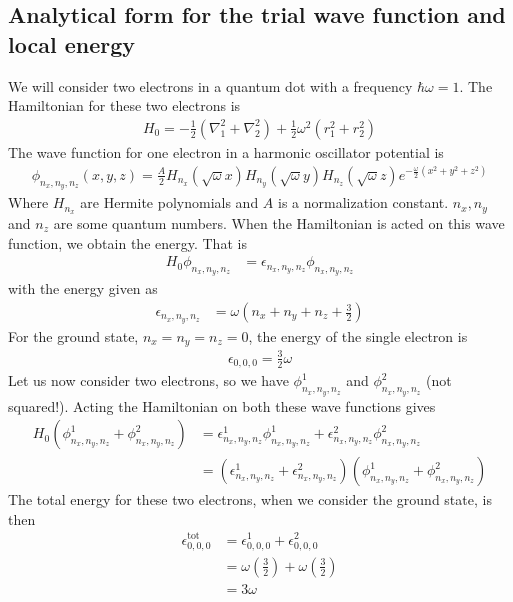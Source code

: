 \documentclass[12pt]{article}
\begin{document}
\subsection{Analytical form for the trial wave function and local energy}
We will consider two electrons in a quantum dot with a frequency $\hbar \omega = 1$. The Hamiltonian for these two electrons is
\begin{align*}
H_0 = -\frac{1}{2}(\nabla_1^2 + \nabla_2^2) + \frac{1}{2}\omega^2(r_1^2 + r_2^2)
\end{align*}
The wave function for one electron in a harmonic oscillator potential is
\begin{align*}
\phi_{n_x, n_y, n_z}(x,y,z) = \frac{A}{2}H_{n_x}(\sqrt{\omega} x)H_{n_y}(\sqrt{\omega}y)H_{n_z}(\sqrt{\omega}z)e^{-\frac{\omega}{2}(x^2+y^2+z^2)}
\end{align*}
Where $H_{n_x}$ are Hermite polynomials and $A$ is a normalization constant. $n_x, n_y$ and $n_z$ are some quantum numbers. When the Hamiltonian is acted on this wave function, we obtain the energy. That is
\begin{align*}
H_0\phi_{n_x, n_y, n_z} &= \epsilon_{n_x, n_y, n_z}\phi_{n_x, n_y, n_z}
\end{align*}
with the energy given as
\begin{align*}
\epsilon_{n_x, n_y, n_z} &= \omega\left(n_x + n_y + n_z + \frac{3}{2} \right)
\end{align*}
For the ground state, $n_x = n_y = n_z = 0$, the energy of the single electron is
\begin{align*}
\epsilon_{0,0,0} = \frac{3}{2}\omega
\end{align*}
Let us now consider two electrons, so we have $\phi_{n_x, n_y, n_z}^1$ and $\phi_{n_x, n_y, n_z}^2$ (not squared!). Acting the Hamiltonian on both these wave functions gives
\begin{align*}
H_0(\phi_{n_x, n_y, n_z}^1 + \phi_{n_x, n_y, n_z}^2) &= \epsilon_{n_x, n_y, n_z}^1\phi_{n_x, n_y, n_z}^1 + \epsilon_{n_x, n_y, n_z}^2\phi_{n_x, n_y, n_z}^2 \\
&= (\epsilon_{n_x, n_y, n_z}^1+\epsilon_{n_x, n_y, n_z}^2)(\phi_{n_x, n_y, n_z}^1 + \phi_{n_x, n_y, n_z}^2)
\end{align*}
The total energy for these two electrons, when we consider the ground state, is then
\begin{align*}
\epsilon_{0,0,0}^{\text{tot}} &= \epsilon_{0,0,0}^1 + \epsilon_{0,0,0}^2 \\
&= \omega\left(\frac{3}{2} \right) + \omega\left(\frac{3}{2} \right)\\
&= 3\omega
\end{align*}
\end{document}
